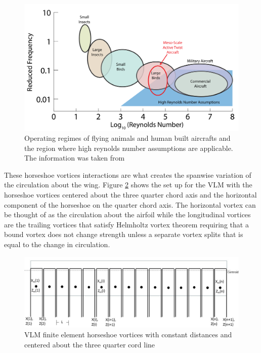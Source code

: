 \documentclass[11pt]{ucthesis}
\begin{document}
\begin{figure}[thpb]
\centering
\includegraphics[width=1\linewidth]{Figures/ReducedFrequencyvReynoldsTypes-01.png}
\caption{Operating regimes of flying animals and human built aircrafts and the region where high reynolds number assumptions are applicable. The information was taken from \cite{mueller2001fixed}}
\label{fig:reynolds}
\end{figure}

These horseshoe vortices interactions are what creates the spanwise variation of the circulation about the wing. Figure \ref{fig:VLM} shows the set up for the VLM with the horseshoe vortices centered about the three quarter chord axis and the horizontal component of the horseshoe on the quarter chord axis. The horizontal vortex can be thought of as the circulation about the airfoil while the longitudinal vortices are the trailing vortices that satisfy Helmholtz vortex theorem requiring that a bound vortex does not change strength unless a separate vortex splits that is equal to the change in circulation. 

\begin{figure}[thpb]
\centering
\includegraphics[width=1\linewidth]{Figures/VortexLaticeMethod.jpg}
\caption{VLM finite element horseshoe vortices with constant distances and centered about the three quarter cord line}
\label{fig:VLM}
\end{figure}
\end{document}
